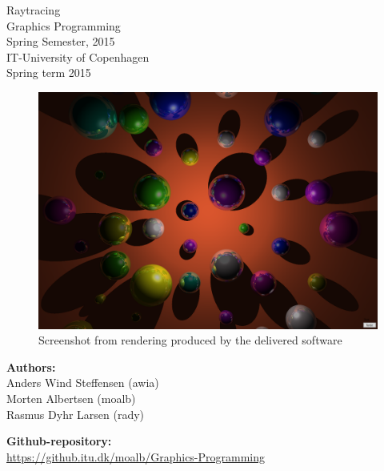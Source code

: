 \begin{titlepage}

\begin{center}

\huge{
Raytracing \\
Graphics Programming \\ 
Spring Semester, 2015 \\ 
\vspace*{8mm} }
\large{
IT-University of Copenhagen \\
Spring term 2015
}
\end{center}
\vspace*{7mm}

\begin{figure}[h!]
	\centering
	\includegraphics[width=1.0\linewidth]{Figures/GrandFinale.png}
	\caption{Screenshot from rendering produced by the delivered software}
\end{figure}



\vspace*{6mm}

\begin{center}
\begin{Large}
\textbf{Authors:} \\
\vspace*{2mm}
Anders Wind Steffensen (awia) \\
Morten Albertsen (moalb) \\ 
Rasmus Dyhr Larsen (rady)
\end{Large}
\end{center}
\vspace{3mm}
\begin{center}
\large
\textbf{Github-repository:} \\
\href{https://github.itu.dk/moalb/Graphics-Programming}{https://github.itu.dk/moalb/Graphics-Programming}
\end{center}

\end{titlepage}
\newpage
